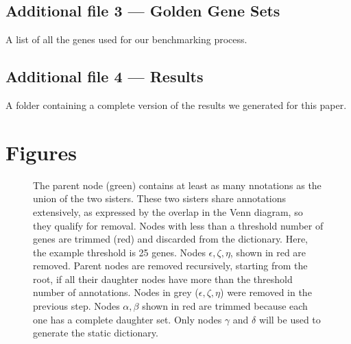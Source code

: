   \subsection*{Additional file 3 --- Golden Gene Sets}
    A list of all the genes used for our benchmarking process.
  \subsection*{Additional file 4 --- Results}
    A folder containing a complete version of the results we generated for this
    paper.


\section*{Figures}

\begin{figure}[htbp]
  \begin{subfigure}[b]{0.3\textwidth}
   	 	\caption{}
\label{fig:simdiagram}
  \end{subfigure}
  \begin{subfigure}[b]{0.3\textwidth}
	      \caption{}
\label{fig:trim_ends}
  \end{subfigure}
  \begin{subfigure}[b]{0.3\textwidth}
    	\caption{}
\label{fig:trim_roots}
  \end{subfigure}

  \captionsetup{width= 0.95\textwidth}
  \caption{
     The parent node (green) contains at least as many
    nnotations as the union of the two sisters. These two sisters share
    annotations extensively, as expressed by the overlap in the Venn diagram,
    so they qualify for removal.
	 Nodes with less than a threshold number of genes are
  trimmed (red) and discarded from the dictionary. Here, the example threshold
  is 25 genes. Nodes $\epsilon, \zeta, \eta$, shown in red are removed.
	 Parent nodes are removed recursively, starting from
  the root, if all their daughter nodes have more than the threshold number of
  annotations. Nodes in grey ($\epsilon, \zeta, \eta$) were removed in the
  previous step. Nodes $\alpha, \beta$ shown in red are trimmed because each one
  has a complete daughter set. Only nodes $\gamma$ and $\delta$ will be used to
  generate the static dictionary.
  }
\end{figure}



